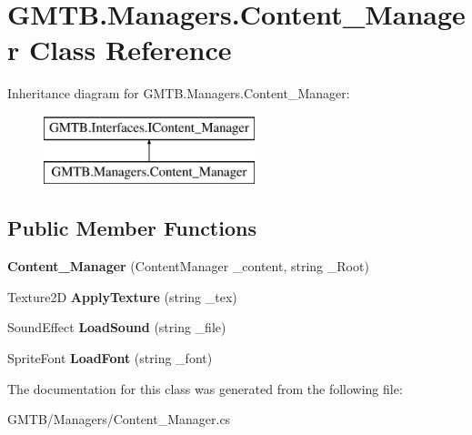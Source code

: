 \hypertarget{class_g_m_t_b_1_1_managers_1_1_content___manager}{}\section{G\+M\+T\+B.\+Managers.\+Content\+\_\+\+Manager Class Reference}
\label{class_g_m_t_b_1_1_managers_1_1_content___manager}
Inheritance diagram for G\+M\+T\+B.\+Managers.\+Content\+\_\+\+Manager\+:\begin{figure}[H]
\begin{center}
\leavevmode
\includegraphics[height=2.000000cm]{class_g_m_t_b_1_1_managers_1_1_content___manager}
\end{center}
\end{figure}
\subsection*{Public Member Functions}
\begin{DoxyCompactItemize}
\item 
\mbox{\label{class_g_m_t_b_1_1_managers_1_1_content___manager_ac0c97be92b949b11b853dc8e9140c68a}} 
{\bfseries Content\+\_\+\+Manager} (Content\+Manager \+\_\+content, string \+\_\+\+Root)
\item 
\mbox{\label{class_g_m_t_b_1_1_managers_1_1_content___manager_a796d3388c8e9d3a82e7630944d216bce}} 
Texture2D {\bfseries Apply\+Texture} (string \+\_\+tex)
\item 
\mbox{\label{class_g_m_t_b_1_1_managers_1_1_content___manager_ac52b81bb275e9822e4a2b68eb74c7bdc}} 
Sound\+Effect {\bfseries Load\+Sound} (string \+\_\+file)
\item 
\mbox{\label{class_g_m_t_b_1_1_managers_1_1_content___manager_a20a3a750bcc376070a7bddb5f1a99e2f}} 
Sprite\+Font {\bfseries Load\+Font} (string \+\_\+font)
\end{DoxyCompactItemize}


The documentation for this class was generated from the following file\+:\begin{DoxyCompactItemize}
\item 
G\+M\+T\+B/\+Managers/Content\+\_\+\+Manager.\+cs\end{DoxyCompactItemize}
